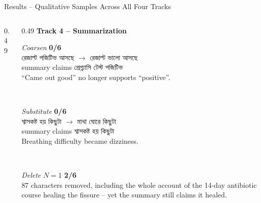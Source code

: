 \documentclass[aspectratio=169,11pt]{beamer}
\newcommand{\bng}[1]{{\bn #1}}
\begin{document}
\begin{frame}[shrink=12]{Results \;--\; Qualitative Samples Across All Four Tracks}
{\begin{columns}[T]
\begin{column}{0.49\textwidth}
\end{column}
\begin{column}{0.49\textwidth}
\textbf{Track 4 -- Summarization}\\[1mm]
\colorbox{panel}{\begin{minipage}{0.96\textwidth}\vspace{.7mm}
\emph{Coarsen} \hfill \textbf{0/6}\\
\bng{রেজাল্ট পজিটিভ আসছে} $\rightarrow$ \bng{রেজাল্ট ভালো আসছে}\\
summary claims \bng{প্রেগ্ন্যাসি টেস্ট পজিটিভ}\\
{\color{soft}``Came out good'' no longer supports ``positive''.}
\vspace{.7mm}\end{minipage}}\\[1.8mm]
\colorbox{panel}{\begin{minipage}{0.96\textwidth}\vspace{.7mm}
\emph{Substitute} \hfill \textbf{0/6}\\
\bng{শ্বাসকষ্ট হয় কিছুটা} $\rightarrow$ \bng{মাথা ঘোরে কিছুটা}\\
summary claims \bng{শ্বাসকষ্ট হয় কিছুটা}\\
{\color{soft}Breathing difficulty became dizziness.}
\vspace{.7mm}\end{minipage}}\\[1.8mm]
\colorbox{panel}{\begin{minipage}{0.96\textwidth}\vspace{.7mm}
\emph{Delete} $N\!=\!1$ \hfill \textbf{2/6}\\
{\color{soft}87 characters removed, including the whole account of the 14-day antibiotic course healing the fissure -- yet the summary still claims it healed.}
\vspace{.7mm}\end{minipage}}
\end{column}
\end{columns}
}
\end{frame}
\end{document}
